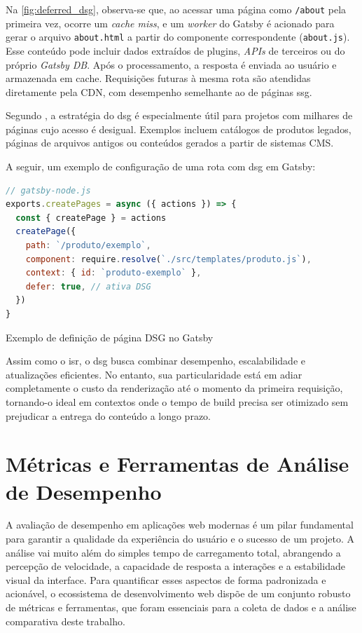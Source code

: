 Na \autoref{fig:deferred_dsg}, observa-se que, ao acessar uma página como \texttt{/about} pela primeira vez, ocorre um \textit{cache miss}, e um \textit{worker} do Gatsby é acionado para gerar o arquivo \texttt{about.html} a partir do componente correspondente (\texttt{about.js}). Esse conteúdo pode incluir dados extraídos de plugins, \textit{APIs} de terceiros ou do próprio \textit{Gatsby DB}. Após o processamento, a resposta é enviada ao usuário e armazenada em cache. Requisições futuras à mesma rota são atendidas diretamente pela CDN, com desempenho semelhante ao de páginas \acrshort{ssg}.

Segundo , a estratégia do \acrshort{dsg} é especialmente útil para projetos com milhares de páginas cujo acesso é desigual. Exemplos incluem catálogos de produtos legados, páginas de arquivos antigos ou conteúdos gerados a partir de sistemas CMS.

A seguir, um exemplo de configuração de uma rota com \acrshort{dsg} em Gatsby:

\begin{codigo}[H]
  \begin{lstlisting}[language=JavaScript]
// gatsby-node.js
exports.createPages = async ({ actions }) => {
  const { createPage } = actions
  createPage({
    path: `/produto/exemplo`,
    component: require.resolve(`./src/templates/produto.js`),
    context: { id: `produto-exemplo` },
    defer: true, // ativa DSG
  })
}
  \end{lstlisting}
  \caption{Exemplo de definição de página DSG no Gatsby}
  \label{cod:dsg_example}
\end{codigo}

Assim como o \acrshort{isr}, o \acrshort{dsg} busca combinar desempenho, escalabilidade e atualizações eficientes. No entanto, sua particularidade está em adiar completamente o custo da renderização até o momento da primeira requisição, tornando-o ideal em contextos onde o tempo de build precisa ser otimizado sem prejudicar a entrega do conteúdo a longo prazo.

















\section{Métricas e Ferramentas de Análise de Desempenho}
\label{sec:metricas-e-ferramentas}
A avaliação de desempenho em aplicações web modernas é um pilar fundamental para garantir a qualidade da experiência do usuário e o sucesso de um projeto. A análise vai muito além do simples tempo de carregamento total, abrangendo a percepção de velocidade, a capacidade de resposta a interações e a estabilidade visual da interface. Para quantificar esses aspectos de forma padronizada e acionável, o ecossistema de desenvolvimento web dispõe de um conjunto robusto de métricas e ferramentas, que foram essenciais para a coleta de dados e a análise comparativa deste trabalho.


